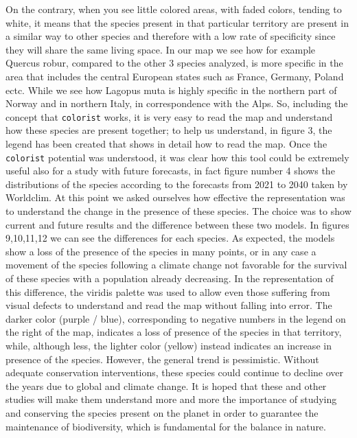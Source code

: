 \documentclass[12pt,a4paper]{article}
\begin{document}
On the contrary, when you see little colored areas, with faded colors, tending to white, it means that the species present in that particular territory are present in a similar way to other species and therefore with a low rate of specificity since they will share the same living space.
In our map we see how for example Quercus robur, compared to the other 3 species analyzed, is more specific in the area that includes the central European states such as France, Germany, Poland ectc. While we see how Lagopus muta is highly specific in the northern part of Norway and in northern Italy, in correspondence with the Alps.
So, including the concept that \texttt{colorist} works, it is very easy to read the map and understand how these species are present together; to help us understand, in figure 3, the legend has been created that shows in detail how to read the map.
Once the \texttt{colorist} potential was understood, it was clear how this tool could be extremely useful also for a study with future forecasts, in fact figure number 4 shows the distributions of the species according to the forecasts from 2021 to 2040 taken by Worldclim.
At this point we asked ourselves how effective the representation was to understand the change in the presence of these species.
The choice was to show current and future results and the difference between these two models.
In figures 9,10,11,12 we can see the differences for each species.
As expected, the models show a loss of the presence of the species in many points, or in any case a movement of the species following a climate change not favorable for the survival of these species with a population already decreasing.
In the representation of this difference, the viridis palette was used to allow even those suffering from visual defects to understand and read the map without falling into error.
The darker color (purple / blue), corresponding to negative numbers in the legend on the right of the map, indicates a loss of presence of the species in that territory, while, although less, the lighter color (yellow) instead indicates an increase in presence of the species.
However, the general trend is pessimistic.
Without adequate conservation interventions, these species could continue to decline over the years due to global and climate change.
It is hoped that these and other studies will make them understand more and more the importance of studying and conserving the species present on the planet in order to guarantee the maintenance of biodiversity, which is fundamental for the balance in nature.
\end{document}
